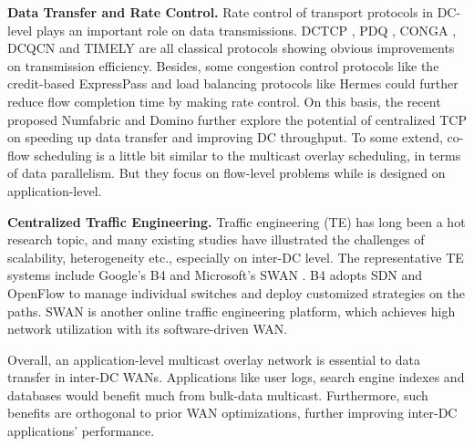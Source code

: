 \textbf{Data Transfer and Rate Control.}
Rate control of transport protocols in DC-level plays an important role on data transmissions. DCTCP \cite{Alizadeh2010Data}, PDQ \cite{Hong2012Finishing}, CONGA \cite{Alizadeh2014CONGA}, DCQCN \cite{Zhu2015Congestion} and TIMELY \cite{Mittal2015TIMELY} are all classical protocols showing obvious improvements on transmission efficiency. Besides, some congestion control protocols like the credit-based ExpressPass \cite{Han2017Credit} and load balancing protocols like Hermes \cite{Zhang2017Resilient} could further reduce flow completion time by making rate control. On this basis, the recent proposed Numfabric \cite{nagaraj2016numfabric} and Domino \cite{sivaraman2016packet} further explore the potential of centralized TCP on speeding up data transfer and improving DC throughput. To some extend, co-flow scheduling \cite{Chowdhury2012Coflow,Zhang2016CODA} is a little bit similar to the multicast overlay scheduling, in terms of data parallelism. But they focus on flow-level problems while \name is designed on application-level.%

\textbf{Centralized Traffic Engineering.} Traffic engineering (TE) has long been a hot research topic, and many existing studies \cite{chen2012design, kavulya2010analysis, mishra2010towards, reiss2012heterogeneity, sharma2011modeling, More, zhang2011characterizing} have illustrated the challenges of scalability, heterogeneity etc., especially on inter-DC level. The representative TE systems include Google's B4 \cite{jain2013b4} and Microsoft's SWAN \cite{hong2013achieving}. B4 adopts SDN \cite{mckeown2009software} and OpenFlow \cite{OpenFlow,mckeown2008openflow} to manage individual switches and deploy customized strategies on the paths. SWAN is another online traffic engineering platform, which achieves high network utilization with its software-driven WAN. %

Overall, an application-level multicast overlay network is essential to data transfer in inter-DC WANs. Applications like user logs, search engine indexes and databases would benefit much from bulk-data multicast. Furthermore, such benefits are orthogonal to prior WAN optimizations, further improving inter-DC applications' performance.


